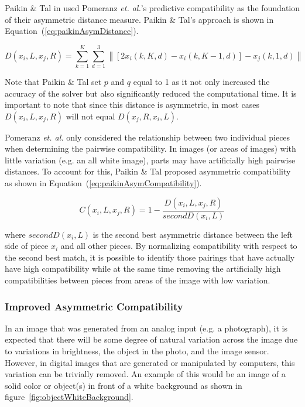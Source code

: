 \documentclass{report}
\def\eref#1{(\ref{#1})}
\newcommand{\norm}[1]{\left\lVert#1\right\rVert}
\begin{document}
Paikin \& Tal in \cite{paikin2015} used Pomeranz \textit{et. al.}'s predictive compatibility as the foundation of their asymmetric distance measure.  Paikin \& Tal's approach is shown in Equation~\eref{eq:paikinAsymDistance}.

\begin{equation} \label{eq:paikinAsymDistance}
D(x_i,L,x_j,R) = \sum_{k=1}^{K}\sum_{d=1}^{3} \norm{[2x_i(k, K, d) - x_i(k, K-1, d)] - x_j(k, 1, d)}
\end{equation}

Note that Paikin \& Tal set $p$ and $q$ equal to 1 as it not only increased the accuracy of the solver but also significantly reduced the computational time.  It is important to note that since this distance is asymmetric, in most cases $D(x_i,L,x_j,R)$ will not equal $D(x_j,R,x_i,L)$.

Pomeranz \textit{et. al.} only considered the relationship between two individual pieces when determining the pairwise compatibility.  In images (or areas of images) with little variation (e.g. an all white image), parts may have artificially high pairwise distances.  To account for this, Paikin \& Tal proposed asymmetric compatibility as shown in Equation~\eref{eq:paikinAsymCompatibility}.

\begin{equation} \label{eq:paikinAsymCompatibility}
C(x_i,L,x_j,R)=1 - \frac{D(x_i,L,x_j,R)}{secondD(x_i,L)}
\end{equation}

\noindent
where $secondD(x_i,L)$ is the second best asymmetric distance between the left side of piece $x_i$ and all other pieces.  By normalizing compatibility with respect to the second best match, it is possible to identify those pairings that have actually have high compatibility while at the same time removing the artificially high compatibilities between pieces from areas of the image with low variation.

\subsubsection{Improved Asymmetric Compatibility}\label{sec:hammoudehPairwiseAffinity}

In an image that was generated from an analog input (e.g. a photograph), it is expected that there will be some degree of natural variation across the image due to variations in brightness, the object in the photo, and the image sensor.  However, in digital images that are generated or manipulated by computers, this variation can be trivially removed.  An example of this would be an image of a solid color or object(s) in front of a white background as shown in figure~\ref{fig:objectWhiteBackground}.
\end{document}
